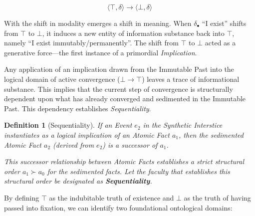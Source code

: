 \documentclass[11pt, a4paper]{article}
\theoremstyle{formalism}
\newtheorem{formalism}{Definition}
\begin{document}
\begin{equation}
    \langle \top, \delta \rangle \rightarrow \langle \bot, \delta \rangle
\end{equation}

With the shift in modality emerges a shift in meaning. When $\delta_\bullet$
``I exist'' shifts from $\top$ to $\bot$, it induces a new entity of
information substance back into $\top$, namely ``I exist immutably/permanently''.
The shift from $\top$ to $\bot$ acted as a generative force---the first
instance of a primordial \textit{Implication}.

Any application of an implication drawn from the Immutable Past into the
logical domain of active convergence ($\bot \rightarrow \top$) leaves a trace
of informational substance. This implies that the current step of convergence
is structurally dependent upon what has already converged and sedimented in the
Immutable Past. This dependency establishes \textit{Sequentiality}.

\begin{formalism}[Sequentiality]
    If an Event $e_2$ in the Synthetic Interstice instantiates as a logical 
    implication of an Atomic Fact $a_1$, then the sedimented Atomic Fact $a_2$ 
    (derived from $e_2$) is a successor of $a_1$.

    This successor relationship between Atomic Facts establishes a strict structural
    order $a_1 \succ a_0$ for the sedimented facts. Let the faculty that 
    establishes this structural order be designated as \textbf{Sequentiality}.
\end{formalism}

By defining $\top$ as the indubitable truth of existence and $\bot$ as the
truth of having passed into fixation, we can identify two foundational
ontological domains:
\end{document}
